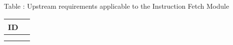 {
  \vspace{0.5em}
  \begin{center}
    Table \thetable: Upstream requirements applicable to the Instruction Fetch Module\label{tab:ifm-upstream-requirements}
  \end{center}
  
\footnotesize
\begin{xltabular}{0.9\textwidth}{|X|c|}
  \hline
  \textbf{ID} \\
  \hline
   \\
  \hline
   \\
  \hline
\end{xltabular}
}
